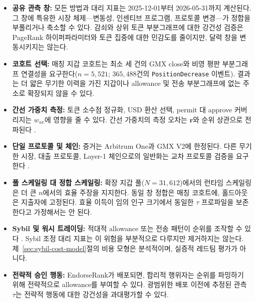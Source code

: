 
\begin{itemize}
\item \textbf{공유 관측 창:} 모든 방법과 대리 지표는 2025-12-01부터 2026-05-31까지 계산된다. 그 창에 특유한 시장 체제---변동성, 인센티브 프로그램, 프로토콜 변경---가 정합을 부풀리거나 축소할 수 있다. 감쇠와 상위 토큰 부분그래프에 대한 강건성 검증은 PageRank 하이퍼파라미터와 토큰 집중에 대한 민감도를 줄이지만, 달력 창을 변동시키지는 않는다.

\item \textbf{코호트 선택:} 매칭 지갑 코호트는 최소 세 건의 GMX close와 비영 평판 부분그래프 연결성을 요구한다($n=5{,}521$; $365{,}488$건의 \texttt{PositionDecrease} 이벤트). 결과는 더 얇은 무기한 이력을 가진 지갑이나 allowance 및 전송 부분그래프에 없는 주소로 확장되지 않을 수 있다.

\item \textbf{간선 가중치 측정:} 토큰 소수점 정규화, USD 환산 선택, permit 대 approve 커버리지는 $w_{uv}$에 영향을 줄 수 있다. 간선 가중치의 측정 오차는 $\mathbf{r}$와 순위 상관으로 전파된다 .
\end{itemize}


\begin{itemize}
\item \textbf{단일 프로토콜 및 체인:} 증거는 Arbitrum One과 GMX V2에 한정된다. 다른 무기한 시장, 대출 프로토콜, Layer-1 체인으로의 일반화는 교차 프로토콜 검증을 요구한다 .

\item \textbf{풀 스케일링 대 정합 스케일링:} 확장 지갑 풀($N=31{,}612$)에서의 런타임 스케일링은 더 큰 $n$에서의 효율 주장을 지지한다. 동일 창 정합은 매칭 코호트에, 홀드아웃은 지출자에 고정된다. 효율 이득이 임의 인구 크기에서 동일한 $\tau$ 프로파일을 보존한다고 가정해서는 안 된다.
\end{itemize}


\begin{itemize}
\item \textbf{Sybil 및 워시 트레이딩:} 적대적 allowance 또는 전송 패턴이 순위를 조작할 수 있다 . Sybil 조정 대리 지표는 이 위험을 부분적으로 다루지만 제거하지는 않는다. 제~\ref{sec:sybil-cost-model}절의 비용 모형은 분석적이며, 실증적 레드팀 평가가 아니다.

\item \textbf{전략적 승인 행동:} EndorseRank가 배포되면, 합리적 행위자는 순위를 파밍하기 위해 전략적으로 allowance를 부여할 수 있다. 광범위한 배포 이전에 추정된 관측 $\tau$는 전략적 행동에 대한 강건성을 과대평가할 수 있다.
\end{itemize}

